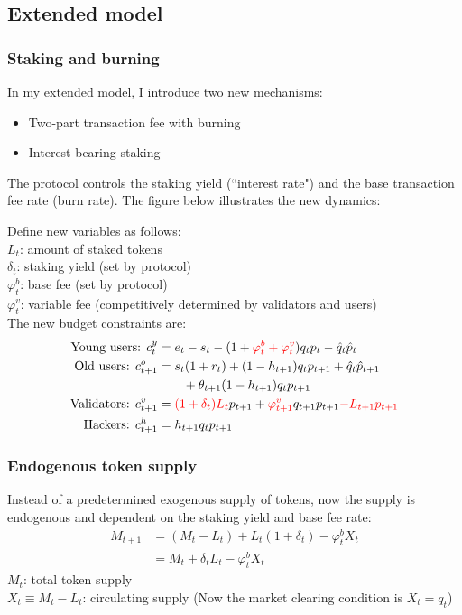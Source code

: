 \documentclass[12pt]{article}
\begin{document}
\subsection{Extended model}
\label{sec:extensions}
\subsubsection{Staking and burning}
In my extended model, I introduce two new mechanisms:
\begin{itemize}
    \item Two-part transaction fee with burning
    \item Interest-bearing staking
\end{itemize}
The protocol controls the staking yield (``interest rate") and the base transaction fee rate (burn rate). The figure below illustrates the new dynamics:



\noindent Define new variables as follows:\\
$L_t$: amount of staked tokens \\
$\delta_t$: staking yield (set by protocol)\\
$\varphi_t^b$: base fee (set by protocol)\\
$\varphi_t^v$: variable fee (competitively determined by validators and users)\\

\noindent The new budget constraints are:
\begin{align}
    \text{Young users: } c_t^y &= e_t - s_t - (1+{\color{red} \varphi_t^b+\varphi_t^v}) q_t p_t - \hat{q}_t \hat{p}_t\\
    \text{Old users: } c_{t+1}^o &=  s_t (1+r_t) + (1-h_{t+1}) q_t p_{t+1} + \hat{q}_t \hat{p}_{t+1} \nonumber \\
     &\hspace{2em} + \theta_{t+1} (1-h_{t+1}) q_t p_{t+1}\\ 
    \text{Validators: } c_{t+1}^v &= {\color{red} (1+\delta_t) L_t} p_{t+1} + {\color{red} \varphi_{t+1}^v} q_{t+1} p_{t+1} {\color{red} - L_{t+1} p_{t+1} }\\
    \text{Hackers: } c_{t+1}^h &= h_{t+1} q_t p_{t+1}
\end{align}

\subsubsection{Endogenous token supply}
Instead of a predetermined exogenous supply of tokens, now the supply is endogenous and dependent on the staking yield and base fee rate:
\begin{align}
    M_{t+1} &= (M_t - L_t) + L_t (1 + \delta_t) - \varphi_t^b X_t \nonumber \\
    &= M_t + \delta_t L_t - \varphi_t^b X_t
\end{align}
$M_t$: total token supply\\
$X_t \equiv M_t - L_t$: circulating supply (Now the market clearing condition is $X_t=q_t$)\\
\end{document}
